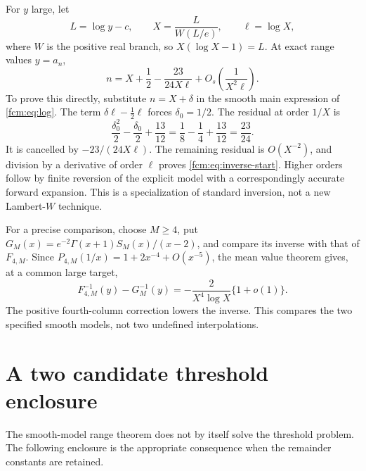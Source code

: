 \documentclass[11pt,letterpaper]{article}
\theoremstyle{remark}\newtheorem{remark}[theorem]{Remark}
\begin{document}
For $y$ large, let
\begin{equation}\label{fcm:eq:Lambert}
 L=\log y-c,\qquad X=\frac{L}{W(L/e)},\qquad \ell=\log X,
\end{equation}
where $W$ is the positive real branch, so $X(\log X-1)=L$. At exact range values $y=a_n$,
\begin{equation}\label{fcm:eq:inverse-start}
 n=X+\frac12-\frac{23}{24X\ell}
       +O_s\left(\frac1{X^2\ell}\right).
\end{equation}
To prove this directly, substitute $n=X+\delta$ in the smooth main expression of \eqref{fcm:eq:log}. The term $\delta\ell-\tfrac12\ell$ forces $\delta_0=1/2$. The residual at order $1/X$ is
\[
 \frac{\delta_0^2}{2}-\frac{\delta_0}{2}+\frac{13}{12}
 =\frac18-\frac14+\frac{13}{12}=\frac{23}{24}.
\]
It is cancelled by $-23/(24X\ell)$. The remaining residual is $O(X^{-2})$, and division by a derivative of order $\ell$ proves \eqref{fcm:eq:inverse-start}. Higher orders follow by finite reversion of the explicit model with a correspondingly accurate forward expansion. This is a specialization of standard inversion, not a new Lambert-$W$ technique.

For a precise comparison, choose $M\ge4$, put $G_M(x)=e^{-2}\Gamma(x+1)S_M(x)/(x-2)$, and compare its inverse with that of $F_{4,M}$. Since $P_{4,M}(1/x)=1+2x^{-4}+O(x^{-5})$, the mean value theorem gives, at a common large target,
\begin{equation}\label{fcm:eq:model-shift}
 F_{4,M}^{-1}(y)-G_M^{-1}(y)
 =-\frac{2}{X^4\log X}\{1+o(1)\}.
\end{equation}
The positive fourth-column correction lowers the inverse. This compares the two specified smooth models, not two undefined interpolations.

\section{A two candidate threshold enclosure}
The smooth-model range theorem does not by itself solve the threshold problem. The following enclosure is the appropriate consequence when the remainder constants are retained.
\end{document}

